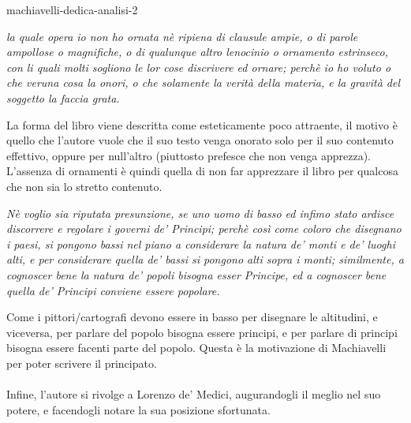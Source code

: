 \documentclass[preview]{standalone}
\begin{document}
\begin{snippet}{machiavelli-dedica-analisi-2}
    \begin{center}
        \begin{minipage}{0.75\textwidth}
            \itshape
            la quale opera io non ho ornata nè ripiena di clausule ampie, o di parole ampollose o magnifiche, o di qualunque altro lenocinio o ornamento estrinseco, con li quali molti sogliono le lor cose discrivere ed ornare; perchè io ho voluto o che veruna cosa la onori, o che solamente la verità della materia, e la gravità del soggetto la faccia grata.
        \end{minipage}
    \end{center}
    \vspace{0.25cm}

    La forma del libro viene descritta come esteticamente poco attraente,
    il motivo è quello che l'autore vuole che il suo testo venga onorato
    solo per il suo contenuto effettivo, oppure per null'altro (piuttosto prefesce che non venga apprezza).
    L'assenza di ornamenti è quindi quella di non far apprezzare il libro per qualcosa che non sia lo stretto contenuto.
    \vspace{0.25cm}
    \begin{center}
        \begin{minipage}{0.75\textwidth}
            \itshape
            Nè voglio sia riputata presunzione, se uno uomo di basso ed infimo stato ardisce discorrere e regolare i governi de' Principi; perchè così come coloro che disegnano i paesi, si pongono bassi nel piano a considerare la natura de' monti e de' luoghi alti, e per considerare quella de' bassi si pongono alti sopra i monti; similmente, a cognoscer bene la natura de' popoli bisogna esser Principe, ed a cognoscer bene quella de' Principi conviene essere popolare.
        \end{minipage}
    \end{center}
    \vspace{0.25cm}
    Come i pittori/cartografi devono essere in basso per disegnare le altitudini, e viceversa, per parlare
    del popolo bisogna essere principi, e per parlare di principi bisogna essere facenti parte del popolo.
    Questa è la motivazione di Machiavelli per poter scrivere il principato.
    \\\\
    Infine, l'autore si rivolge a Lorenzo de' Medici, augurandogli il meglio nel suo potere, e facendogli
    notare la sua posizione sfortunata.
\end{snippet}
\end{document}
